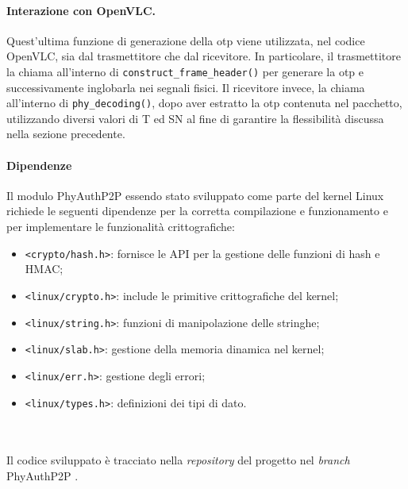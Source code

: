 \paragraph{Interazione con OpenVLC.}
Quest'ultima funzione di generazione della \gls{otp} viene utilizzata, nel codice OpenVLC, sia dal trasmettitore che dal ricevitore.
In particolare, il trasmettitore la chiama all'interno di \texttt{construct\_frame\_header()} per generare la \gls{otp} e successivamente inglobarla nei segnali fisici. Il ricevitore invece, la chiama all'interno di \texttt{phy\_decoding()}, dopo aver estratto la \gls{otp} contenuta nel pacchetto, utilizzando diversi valori di T ed SN al fine di garantire la flessibilità discussa nella sezione precedente.

\paragraph{Dipendenze}
Il modulo PhyAuthP2P essendo stato sviluppato come parte del kernel Linux richiede le seguenti dipendenze per la corretta compilazione e funzionamento e per implementare le funzionalità crittografiche:
\begin{itemize}
    \item \texttt{<crypto/hash.h>}: fornisce le API per la gestione delle funzioni di hash e HMAC;
    \item \texttt{<linux/crypto.h>}: include le primitive crittografiche del kernel;
    \item \texttt{<linux/string.h>}: funzioni di manipolazione delle stringhe;
    \item \texttt{<linux/slab.h>}: gestione della memoria dinamica nel kernel;
    \item \texttt{<linux/err.h>}: gestione degli errori;
    \item \texttt{<linux/types.h>}: definizioni dei tipi di dato.\\\\\\
\end{itemize}

\noindent Il codice sviluppato è tracciato nella \textit{repository} del progetto nel \textit{branch} PhyAuthP2P \cite{site:openvlc-pa-github}.

